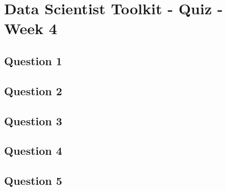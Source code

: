 \documentclass[french]{article}
\begin{document}
\section*{Data Scientist Toolkit - Quiz - Week 4}
\subsection*{Question 1}

\newpage
\subsection*{Question 2}


\newpage
\subsection*{Question 3}


\newpage
\subsection*{Question 4}


\newpage
\subsection*{Question 5}
\end{document}
